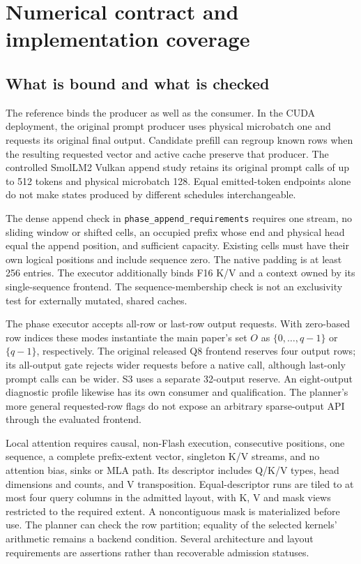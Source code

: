 \section{Numerical contract and implementation coverage}
\label{sec:supp-contract}

\subsection{What is bound and what is checked}
The reference binds the producer as well as the consumer. In the CUDA deployment, the original prompt producer uses physical microbatch one and requests its original final output. Candidate prefill can regroup known rows when the resulting requested vector and active cache preserve that producer. The controlled SmolLM2 Vulkan append study retains its original prompt calls of up to 512 tokens and physical microbatch 128. Equal emitted-token endpoints alone do not make states produced by different schedules interchangeable.

The dense append check in \texttt{phase\_append\_requirements} requires one stream, no sliding window or shifted cells, an occupied prefix whose end and physical head equal the append position, and sufficient capacity. Existing cells must have their own logical positions and include sequence zero. The native padding is at least 256 entries. The executor additionally binds F16 K/V and a context owned by its single-sequence frontend. The sequence-membership check is not an exclusivity test for externally mutated, shared caches.

The phase executor accepts all-row or last-row output requests. With zero-based row indices these modes instantiate the main paper's set $O$ as $\{0,\ldots,q-1\}$ or $\{q-1\}$, respectively. The original released Q8 frontend reserves four output rows; its all-output gate rejects wider requests before a native call, although last-only prompt calls can be wider. S3 uses a separate 32-output reserve. An eight-output diagnostic profile likewise has its own consumer and qualification. The planner's more general requested-row flags do not expose an arbitrary sparse-output API through the evaluated frontend.

Local attention requires causal, non-Flash execution, consecutive positions, one sequence, a complete prefix-extent vector, singleton K/V streams, and no attention bias, sinks or MLA path. Its descriptor includes Q/K/V types, head dimensions and counts, and V transposition. Equal-descriptor runs are tiled to at most four query columns in the admitted layout, with K, V and mask views restricted to the required extent. A noncontiguous mask is materialized before use. The planner can check the row partition; equality of the selected kernels' arithmetic remains a backend condition. Several architecture and layout requirements are assertions rather than recoverable admission statuses.

